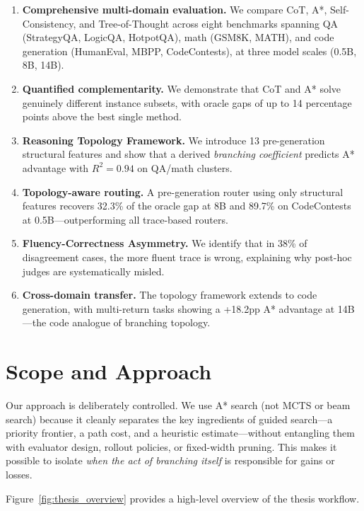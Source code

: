 \begin{enumerate}
\item \textbf{Comprehensive multi-domain evaluation.} We compare CoT, A*, Self-Consistency, and Tree-of-Thought across eight benchmarks spanning QA (StrategyQA, LogicQA, HotpotQA), math (GSM8K, MATH), and code generation (HumanEval, MBPP, CodeContests), at three model scales (0.5B, 8B, 14B).

\item \textbf{Quantified complementarity.} We demonstrate that CoT and A* solve genuinely different instance subsets, with oracle gaps of up to 14 percentage points above the best single method.

\item \textbf{Reasoning Topology Framework.} We introduce 13 pre-generation structural features and show that a derived \emph{branching coefficient} predicts A* advantage with $R^2 = 0.94$ on QA/math clusters.

\item \textbf{Topology-aware routing.} A pre-generation router using only structural features recovers 32.3\% of the oracle gap at 8B and 89.7\% on CodeContests at 0.5B---outperforming all trace-based routers.

\item \textbf{Fluency-Correctness Asymmetry.} We identify that in 38\% of disagreement cases, the more fluent trace is wrong, explaining why post-hoc judges are systematically misled.

\item \textbf{Cross-domain transfer.} The topology framework extends to code generation, with multi-return tasks showing a +18.2pp A* advantage at 14B---the code analogue of branching topology.
\end{enumerate}

\section{Scope and Approach}

Our approach is deliberately controlled. We use A* search (not MCTS or beam search) because it cleanly separates the key ingredients of guided search---a priority frontier, a path cost, and a heuristic estimate---without entangling them with evaluator design, rollout policies, or fixed-width pruning. This makes it possible to isolate \emph{when the act of branching itself} is responsible for gains or losses.

Figure~\ref{fig:thesis_overview} provides a high-level overview of the thesis workflow.

